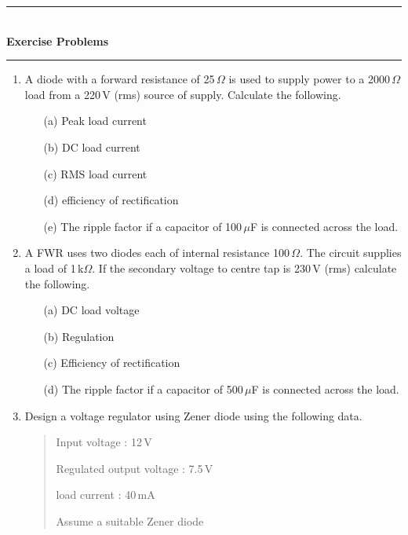 \begin{center}
\rule{5cm}{1pt}\\[-2pt]
{\bf Exercise Problems}\\[-4pt]
\rule{5cm}{1pt}
\end{center}
\begin{enumerate}
\renewcommand{\labelenumi}{\bf\theenumi.}
\item A diode with a forward resistance of 25\,$\Omega$ is used to supply power to a 2000\,$\Omega$ load from a 220\,V (rms) source of supply. Calculate the following.
\begin{itemize}
\item[(a)] Peak load current

\item[(b)] DC load current

\item[(c)] RMS load current

\item[(d)] efficiency of rectification

\item[(e)] The ripple factor if a capacitor of 100\,$\mu$F is connected across the load.
\end{itemize}

\item A FWR uses two diodes each of internal resistance 100\,$\Omega$. The circuit supplies a load of 1\,k$\Omega$. If the secondary voltage to centre tap is 230\,V (rms) calculate the following.
\begin{itemize}
\item[(a)] DC load voltage

\item[(b)] Regulation 

\item[(c)] Efficiency of rectification

\item[(d)] The ripple factor if a capacitor of 500\,$\mu$F is connected across the load.
\end{itemize}

\item Design a voltage regulator using Zener diode using the following data.
\begin{quote}
Input voltage : 12\,V

Regulated output voltage : 7.5\,V

load current : 40\,mA

Assume a suitable Zener diode
\end{quote}


\end{enumerate}
